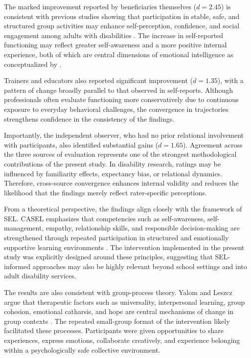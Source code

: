 \documentclass[12pt,a4paper]{article}
\begin{document}
The marked improvement reported by beneficiaries themselves ($d = 2.45$) is consistent with previous studies showing that participation in stable, safe, and structured group activities may enhance self-perception, confidence, and social engagement among adults with disabilities \citep{hall2009,verdonschot2009}. The increase in self-reported functioning may reflect greater self-awareness and a more positive internal experience, both of which are central dimensions of emotional intelligence as conceptualized by \citet{goleman1995}.

Trainers and educators also reported significant improvement ($d = 1.35$), with a pattern of change broadly parallel to that observed in self-reports. Although professionals often evaluate functioning more conservatively due to continuous exposure to everyday behavioral challenges, the convergence in trajectories strengthens confidence in the consistency of the findings.

Importantly, the independent observer, who had no prior relational involvement with participants, also identified substantial gains ($d = 1.65$). Agreement across the three sources of evaluation represents one of the strongest methodological contributions of the present study. In disability research, ratings may be influenced by familiarity effects, expectancy bias, or relational dynamics. Therefore, cross-source convergence enhances internal validity and reduces the likelihood that the findings merely reflect rater-specific perceptions.

From a theoretical perspective, the findings align closely with the framework of SEL. CASEL emphasizes that competencies such as self-awareness, self-management, empathy, relationship skills, and responsible decision-making are strengthened through repeated participation in structured and emotionally supportive learning environments \citep{casel2020,weissberg2015}. The intervention implemented in the present study was explicitly designed around these principles, suggesting that SEL-informed approaches may also be highly relevant beyond school settings and into adult disability services.

The results are also consistent with group-process theory. Yalom and Leszcz argue that therapeutic factors such as universality, interpersonal learning, group cohesion, emotional catharsis, and hope are central mechanisms of change in group contexts \citep{yalom2005}. The repeated small-group format of the intervention likely facilitated these processes. Participants were given opportunities to share experiences, express emotions, collaborate creatively, and experience belonging within a psychologically safe collective environment.
\end{document}
